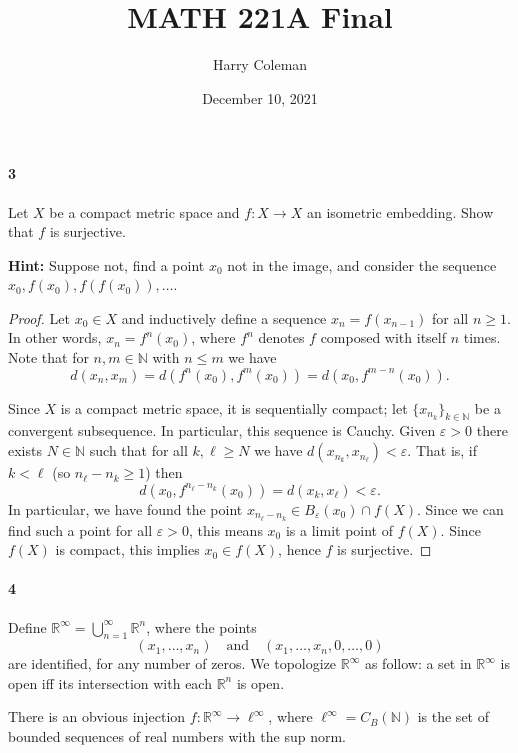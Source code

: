 \documentclass[12pt]{article}
\renewcommand{\maketitle}{\thispagestyle{title}}
\newlength{\myparskip}
\newenvironment{fullbox}{\begin{lrbox}{\savefullbox}\begin{minipage}{\dimexpr\textwidth-2\fboxsep\relax}\setlength{\parskip}{\myparskip}}{\end{minipage}\end{lrbox}\framebox[\textwidth]{\usebox{\savefullbox}}}
\newenvironment{pbox}[1][]{\begin{fullbox}\ifx#1\empty\else\paragraph{#1}\phantom{}\fi}{\end{fullbox}}
\theoremstyle{definition}
\newcommand{\isp}[1]{\quad\text{#1}\quad}
\newcommand{\N}{\mathbb{N}}
\newcommand{\R}{\mathbb{R}}
\newcommand{\eps}{\varepsilon}
\newcommand{\<}{\langle}
\renewcommand{\>}{\rangle}
\begin{document}
\title{MATH 221A Final}
\author{Harry Coleman}
\date{December 10, 2021}
\maketitle


\begin{pbox}[3]
    Let $X$ be a compact metric space and $f : X \to X$ an isometric embedding.
    Show that $f$ is surjective.

    \textbf{Hint:} Suppose not, find a point $x_0$ not in the image, and consider the sequence $x_0, f(x_0), f(f(x_0)), \dots$. 
\end{pbox}

\begin{proof}
    Let $x_0 \in X$ and inductively define a sequence $x_n = f(x_{n-1})$ for all $n \geq 1$.
    In other words, $x_n = f^n(x_0)$, where $f^n$ denotes $f$ composed with itself $n$ times.
    Note that for $n, m \in \N$ with $n \leq m$ we have
    \[
        d(x_n, x_m)
            = d(f^n(x_0), f^m(x_0))
            = d(x_0, f^{m-n}(x_0)).
    \]

    Since $X$ is a compact metric space, it is sequentially compact; let $\{x_{n_k}\}_{k \in \N}$ be a convergent subsequence.
    In particular, this sequence is Cauchy.
    Given $\eps > 0$ there exists $N \in \N$ such that for all $k, \ell \geq N$ we have $d(x_{n_k}, x_{n_\ell}) < \eps$.
    That is, if $k < \ell$ (so $n_\ell - n_k \geq 1$) then
    \[
        d(x_0, f^{n_\ell - n_k}(x_0)) = d(x_k, x_\ell) < \eps.
    \]
    In particular, we have found the point $x_{n_\ell - n_k} \in B_{\eps}(x_0) \cap f(X)$.
    Since we can find such a point for all $\eps > 0$, this means $x_0$ is a limit point of $f(X)$.
    Since $f(X)$ is compact, this implies $x_0 \in f(X)$, hence $f$ is surjective.
\end{proof}


\newpage
\begin{pbox}[4]
    Define $\R^\infty = \bigcup_{n=1}^{\infty} \R^n$, where the points 
    \[
        (x_1, \dots, x_n) \isp{and} (x_1, \dots, x_n, 0, \dots, 0)
    \]
    are identified, for any number of zeros.
    We topologize $\R^\infty$ as follow: a set in $\R^\infty$ is open iff its intersection with each $\R^n$ is open.

    There is an obvious injection $f : \R^\infty \to \ell^\infty$, where $\ell^\infty = C_B(\N)$ is the set of bounded sequences of real numbers with the sup norm. 
\end{pbox}
\end{document}
